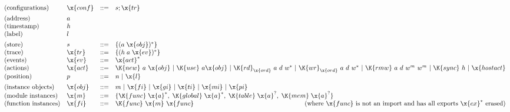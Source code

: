 
\begin{figure*}
\footnotesize\fontsize{9pt}{9pt}


$$
\begin{array}{@{}ll@{}}
\begin{array}[b]{@{}llcl@{}}
\text{(configurations)} & \x{conf} &::=&
  s; \x{tr} \\
[1ex]
\text{(address)} & a \\
\text{(timestamp)} & h \\
\text{(label)} & l \\
[1ex]
\text{(store)} & s &::=&
  \{(a \; \x{obj})^\ast\} \\
\text{(trace)} & \x{tr} &::=&
  \{(h \; a \; \x{ev})^\ast\} \\
\text{(events)} & \x{ev} &::=&
  \x{act}^\ast \\
\text{(actions)} & \x{act} &::=&
  \K{new}~a~\x{obj} ~|~
  \K{use}~a \x{obj} ~|~
  \K{rd}_{\x{ord}}~a~d~w^\ast ~|~
  \K{wr}_{\x{ord}}~a~d~w^\ast ~|~
  \K{rmw}~a~d~w^m~w^m ~|~
  \K{sync}~h ~|~
  \x{hostact} \\
\text{(position)} & p &::=&
  n ~|~ \x{l} \\
[1ex]
\text{(instance objects)} & \x{obj} &::=&
  m ~|~ \x{fi} ~|~ \x{gi} ~|~ \x{ti} ~|~ \x{mi} ~|~ \x{pi} \\
\text{(module instances)} & \x{m} &::=&
  \{{\K{func}} \; \x{a}^\ast,\; {\K{global}} \; \x{a}^\ast,\; {\K{table}} \; \x{a}^?,\; {\K{mem}} \; \x{a}^?\} \\
\text{(function instances)} & \x{fi} &::=&
  \K{func}~\x{m}~\x{func}
  \hfill \quad \text{(where $\x{func}$ is not an import and has all exports $\x{ex}^\ast$ erased)} \\

\end{array}
\end{array}$$
\end{figure*}
